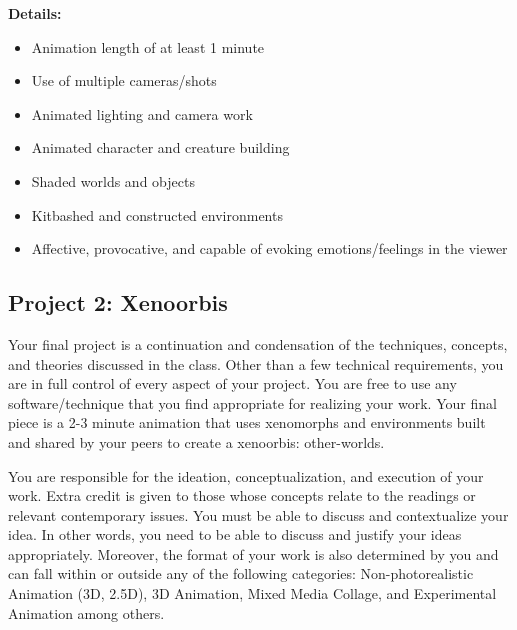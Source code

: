 \textbf{Details:}
\begin{itemize}
	\tightlist
	\item Animation length of at least 1 minute
	\item Use of multiple cameras/shots
	\item Animated lighting and camera work
	\item Animated character and creature building
	\item Shaded worlds and objects
	\item Kitbashed and constructed environments
	\item Affective, provocative, and capable of evoking emotions/feelings in the viewer
\end{itemize}

\hypertarget{project3}{\subsection{Project 2: Xenoorbis}}

Your final project is a continuation and condensation of the techniques, concepts, and theories discussed in the class. Other than a few technical requirements, you are in full control of every aspect of your project. You are free to use any software/technique that you find appropriate for realizing your work. Your final piece is a 2-3 minute animation that uses xenomorphs and environments built and shared by your peers to create a xenoorbis: other-worlds.

You are responsible for the ideation, conceptualization, and execution of your work. Extra credit is given to those whose concepts relate to the readings or relevant contemporary issues. You must be able to discuss and contextualize your idea. In other words, you need to be able to discuss and justify your ideas appropriately. Moreover, the format of your work is also determined by you and can fall within or outside any of the following categories: Non-photorealistic Animation (3D, 2.5D), 3D Animation, Mixed Media Collage, and Experimental Animation among others.

